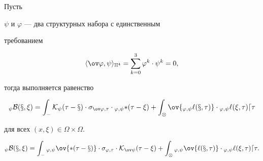 \begin{thm} Пусть 


$\psi$ и $\varphi$ --- два структурных набора с единственным 


требованием 


\begin{equation} 


\la\ov\varphi,\psi\ra_{\Bbb H^4}=\sum^3_{k=0}\varphi^k\cdot\psi^k=0, 


\end{equation} 


тогда выполняется равенство 


$$ 


{}_\psi\cal B(x,\xi)=\int_\Gamma\cal K_\psi(\tau-x)\cdot 


\sigma_{\ov\varphi,\tau}\cdot{}_{\varphi,\psi}\Lambda(\tau-\xi)+ 


\int_\Omega\ov{{}_{\varphi,\psi}\ell(x,\tau)}\cdot 


{}_{\varphi,\psi}\ell(\xi,\tau)d\tau 


$$ 


для всех $(x,\xi)\in\Omega\times\Omega$. 


\end{thm} 


 


\begin{cor} 


$$ 


{}_\psi\cal B(x,\xi)=\int_\Gamma{}_{\varphi,\psi} 


\ov{\Lambda(\tau-x)}\cdot\sigma_{\varphi,\tau}\cdot 


\cal K_{\ov\psi}(\tau-\xi)+\int_\Omega 


{}_{\varphi,\psi}\ov{\ell(x,\tau)}\cdot{}_{\varphi,\psi} 


\ell(\xi,\tau)d\tau. 


$$ 


\end{cor} 


 



